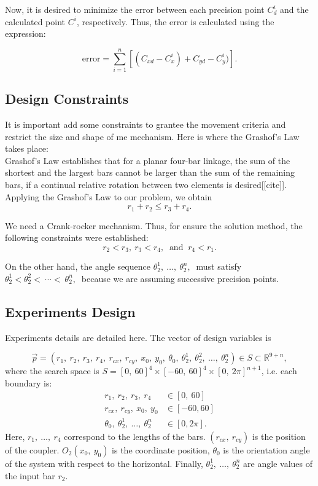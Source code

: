 \documentclass[12pt,letterpape]{article}
\begin{document}
Now, it is desired to minimize the error between each precision point $C^i_d$ and
the calculated point $C^i$, respectively. Thus, the error is calculated using the
expression:

$$
	\text{error} = \sum_{i=1}^n \left[ (C_{xd} - C_x^i) + C_{yd} - C_y^i) \right]. 
$$

% 
\subsection{Design Constraints} %
\label{sub:design_constraints}
It is important add some constraints to grantee the movement criteria and restrict
the size and shape of me mechanism. Here is where the Grashof's Law takes place:\\

Grashof's Law establishes that for a planar four-bar linkage, the sum of the shortest
and the largest bars cannot be larger than the sum of the remaining bars, if a
continual relative rotation between two elements is desired[[cite]]. \\

Applying the Grashof's Law to our problem, we obtain
$$
r_1 + r_2 \leq r_3 + r_4.
$$

We need a Crank-rocker mechanism. Thus, for ensure the solution method, the following constraints were established:
$$
r_2 < r_3, \ r_3 < r_4, \ \text{ and } \ r_4 < r_1.
$$

On the other hand, the angle sequence $\theta_2^1,\ \ldots,\ \theta_2^n,\ $ must satisfy
$ \theta_2^1 < \theta_2^2 <\ \cdots < \ \theta_2^n,\ $ because we are assuming successive precision points.

\subsection{Experiments Design} %
\label{sec:experiments_design}

Experiments details are detailed here. The vector of design variables is

$$
	\vec{p} = ( r_1,\ r_2,\ r_3,\ r_4,\ r_{cx},\ r_{cy},\ x_0,\ y_0,\ \theta_0,\ \theta_2^1,\ \theta_2^2,\ \ldots,\ \theta_2^n  ) \in S \subset \mathbb{R}^{9+n},
$$
% 
where the search space is $S = [0,\ 60]^4 \times [-60,\ 60]^4 \times [0,\ 2\pi ]^{n+1} $, i.e. each boundary is:
% 
% 
\begin{align*}
       r_1,\ r_2,\ r_3,\ r_4 & \in [0,\ 60]\\
 r_{cx},\ r_{cy},\ x_0,\ y_0 & \in [-60, 60]\\	
\theta_0,\ \theta_2^1,\ \ldots,\ \theta_2^n &\in [0, 2\pi].
\end{align*}
% 
Here, $r_1,\ \ldots,\ r_4$ correspond to the lengths of the bars. $(r_{cx},\ r_{cy})$
is the position of the coupler. $O_2(x_0,\ y_0)$ is the coordinate position,
$\theta_0$ is the orientation angle of the system with respect to the horizontal. Finally, $\theta_2^1,\ \ldots,\ \theta_2^n$ are angle values of the input bar $r_2$.\\
% 
\end{document}
